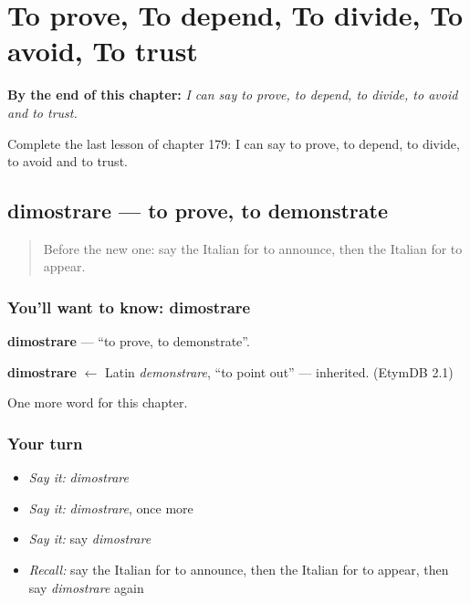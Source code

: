 
\chapter{To prove, To depend, To divide, To avoid, To trust}
\label{ch:it-to-prove-to-depend-to-divide-to-avoid-to-trust}

\begin{chapteropening}
\textbf{By the end of this chapter:} \emph{I can say to prove, to depend, to divide, to avoid and to trust.}

Complete the last lesson of chapter 179: I can say to prove, to depend, to divide, to avoid and to trust.
\end{chapteropening}

\section[dimostrare]{dimostrare — to prove, to demonstrate}

\label{lesson:IT-C179-dimostrare}



\begin{quote}
Before the new one: say the Italian for to announce, then the Italian for to appear.
\end{quote}

\subsection*{You'll want to know: dimostrare}
\textbf{dimostrare} — \textquotedblleft{}to prove, to demonstrate\textquotedblright{}.

\begin{cousinweb}
\textbf{dimostrare} $\leftarrow$ Latin \emph{demonstrare}, \textquotedblleft{}to point out\textquotedblright{} — inherited. (EtymDB 2.1)
\end{cousinweb}

\begin{grammarlens}[title={What you've built}]
One more word for this chapter.
\end{grammarlens}

\subsection*{Your turn}
\begin{itemize}
\raggedright
  \item \emph{Say it:} \emph{dimostrare}
  \item \emph{Say it:} \emph{dimostrare}, once more
  \item \emph{Say it:} say \emph{dimostrare}
  \item \emph{Recall:} say the Italian for to announce, then the Italian for to appear, then say \emph{dimostrare} again
\end{itemize}

